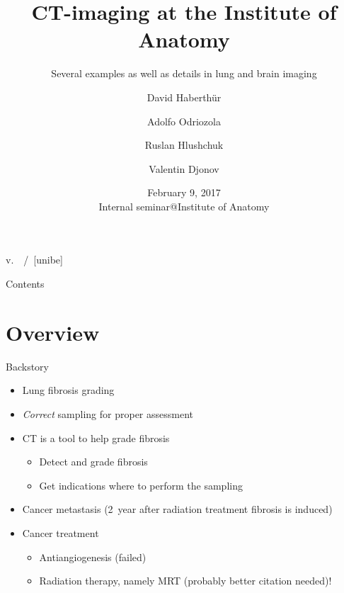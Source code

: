 \documentclass[caption=numbered]{beamer}
\subtitle{Several examples as well as details in lung and brain imaging}
\author[David Haberthür]{David Haberthür \and\tiny Adolfo Odriozola \and Ruslan Hlushchuk \and Valentin Djonov}
\institute{Institute of Anatomy\\Universität Bern}
\date{February 9, 2017\\Internal seminar@Institute of Anatomy}
\newcommand{\uct}{\si{\micro}CT\xspace}
\begin{document}
\title[\si{\micro}CT in biological studies]{\si{\micro}CT-imaging at the Institute of Anatomy} %

{%
	\hspace*{\fill}%
	\insertshortauthor%
	\hspace*{\fill}%
	\insertshorttitle%
	\hspace*{\fill}%
	v.~\gitAbbrevHash%
	\hspace*{\fill}%
	\insertframenumber\,/\,\insertpresentationendpage%
	\hspace*{\fill}%
	\vskip2pt%
}
[unibe]

{
\begin{frame}
  \titlepage
\end{frame}
}
\addtocounter{framenumber}{1}

\begin{frame}{Contents}
	\tableofcontents
\end{frame}

\section{Overview}
\begin{frame}{Backstory}
    \begin{itemize}
        \item Lung fibrosis grading \cite{Ashcroft1988a}
        \item \emph{Correct} sampling for proper assessment
        \item \uct is a tool to help grade fibrosis
        \begin{itemize}
            \item Detect and grade fibrosis
            \item Get indications where to perform the sampling
        \end{itemize}
        \item Cancer metastasis (\SI{2}{year} after radiation treatment fibrosis is induced)
        \item Cancer treatment
        \begin{itemize}
            \item Antiangiogenesis (failed)
            \item Radiation therapy, namely MRT \cite{Bronnimann2016} (probably better citation needed)!
        \end{itemize}
    \end{itemize}
\end{frame}
\end{document}
